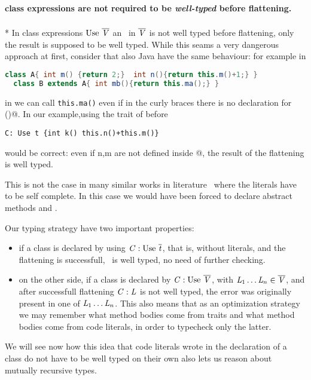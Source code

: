 \paragraph*{class expressions are not required to be \emph{well-typed} before flattening.}${}_{}$\\*
In class expressions  $\use\ \overline\mV$
an \mL\ in $\overline{\mathit{V}}$ is not well typed before flattening, only the result is supposed to be well typed.
While this seams a very dangerous approach at first, consider that also Java have the same behaviour:
for example in
\begin{lstlisting}[language=Java]
  class A{ int m() {return 2;}  int n(){return this.m()+1;} }
  class B extends A{ int mb(){return this.ma();} }
\end{lstlisting}

\noindent in \Q@B@ we can call \lstinline{this.ma()} even if in the curly braces there is no declaration for \Q@ma()@.
In our example,using the trait \Q@t@ of before

\begin{lstlisting}
C: Use t {int k() this.n()+this.m()}
\end{lstlisting}
\noindent would be correct: even if n,m are not defined inside
@,
the result of the flattening is well typed.

This is not the case in many similar works in literature~\cite{} where the
literals have to be self complete. In this case we would have been forced to
declare abstract methods \Q@n@ and \Q@m@.

Our typing strategy have two important properties:
\begin{itemize}
\item if a class is declared by using $\mC : \use\ \overline\mt$, that is, without literals,
and the flattening is successfull, \mC\ is well typed, no need of further checking.
\item on the other side, if a class is declared by $\mC : \use\ \overline\mV$, with
$\mathit{L}_1\ldots\mathit{L}_n \in \overline{\mathit{V}}$, and after successfull flattening $\mathit{C} : \mathit{L}$ is not well typed,
the error was originally present in one of $\mathit{L}_1\ldots\mathit{L}_n$.
This also means that as an optimization strategy
 we may remember what method bodies come from traits and what method bodies come from code literals, in order to typecheck only the latter.
 \end{itemize}

We will see now how this idea that code literals wrote in the declaration of a class
do not have to be well typed on their own also lets us reason about mutually recursive types.

